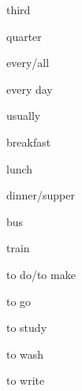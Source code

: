 \begin{flashcard}{\LARGE third}
\LARGE {}
\end{flashcard}
\begin{flashcard}{\LARGE quarter}
\LARGE {}
\end{flashcard}
\begin{flashcard}{\LARGE every/all}
\LARGE {}
\end{flashcard}
\begin{flashcard}{\LARGE every day}
\LARGE {}
\end{flashcard}
\begin{flashcard}{\LARGE usually}
\LARGE {}
\end{flashcard}
\begin{flashcard}{\LARGE breakfast}
\LARGE {}
\end{flashcard}
\begin{flashcard}{\LARGE lunch}
\LARGE {}
\end{flashcard}
\begin{flashcard}{\LARGE dinner/supper}
\LARGE {}
\end{flashcard}
\begin{flashcard}{\LARGE bus}
\LARGE {}
\end{flashcard}
\begin{flashcard}{\LARGE train}
\LARGE {}
\end{flashcard}
\begin{flashcard}{\LARGE to do/to make}
\LARGE {}
\end{flashcard}
\begin{flashcard}{\LARGE to go}
\LARGE {}
\end{flashcard}
\begin{flashcard}{\LARGE to study}
\LARGE {}
\end{flashcard}
\begin{flashcard}{\LARGE to wash}
\LARGE {}
\end{flashcard}
\begin{flashcard}{\LARGE to write}
\LARGE {}
\end{flashcard}
